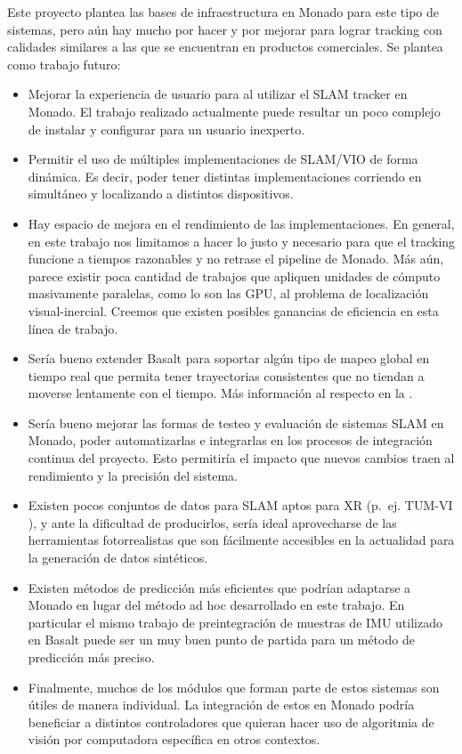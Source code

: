 \documentclass[ twoside,openright,titlepage,numbers=noenddot,%
                headinclude,footinclude,cleardoublepage=empty,abstract=on,
                BCOR=-5mm,paper=a4,fontsize=11pt
                ]{scrreprt}
\begin{document}
Este proyecto plantea las bases de infraestructura en Monado para este
tipo de sistemas, pero aún hay mucho por hacer y por mejorar para lograr
tracking con calidades similares a las que se encuentran en productos
comerciales. Se plantea como trabajo futuro:\newline

\begin{itemize}
\item
  Mejorar la experiencia de usuario para al utilizar el SLAM tracker en
  Monado. El trabajo realizado actualmente puede resultar un poco
  complejo de instalar y configurar para un usuario inexperto.
\item
  Permitir el uso de múltiples implementaciones de SLAM/VIO de forma
  dinámica. Es decir, poder tener distintas implementaciones corriendo
  en simultáneo y localizando a distintos dispositivos.
\item
  Hay espacio de mejora en el rendimiento de las implementaciones. En
  general, en este trabajo nos limitamos a hacer lo justo y necesario
  para que el tracking funcione a tiempos razonables y no retrase el
  pipeline de Monado. Más aún, parece existir poca cantidad de trabajos
  que apliquen unidades de cómputo masivamente paralelas, como lo son
  las GPU, al problema de localización visual-inercial. Creemos que
  existen posibles ganancias de eficiencia en esta línea de trabajo.
\item
  Sería bueno extender Basalt para soportar algún tipo de mapeo global
  en tiempo real que permita tener trayectorias consistentes que no
  tiendan a moverse lentamente con el tiempo. Más información al
  respecto en la .
\item
  Sería bueno mejorar las formas de testeo y evaluación de sistemas SLAM
  en Monado, poder automatizarlas e integrarlas en los procesos de
  integración continua del proyecto. Esto permitiría el impacto que
  nuevos cambios traen al rendimiento y la precisión del sistema.
\item
  Existen pocos conjuntos de datos para SLAM aptos para XR (p.~ej.
  TUM-VI \autocite{schubertBasaltTUMVI2018}), y ante la dificultad de
  producirlos, sería ideal aprovecharse de las herramientas
  fotorrealistas que son fácilmente accesibles en la actualidad para la
  generación de datos sintéticos.
\item
  Existen métodos de predicción más eficientes que podrían adaptarse a
  Monado en lugar del método ad hoc desarrollado en este trabajo. En
  particular el mismo trabajo de preintegración de muestras de IMU
  utilizado en Basalt
  \autocite{forsterOnManifoldPreintegrationRealTime2017} puede ser un
  muy buen punto de partida para un método de predicción más preciso.
\item
  Finalmente, muchos de los módulos que forman parte de estos sistemas
  son útiles de manera individual. La integración de estos en Monado
  podría beneficiar a distintos controladores que quieran hacer uso de
  algoritmia de visión por computadora específica en otros contextos.
\end{itemize}
\end{document}
